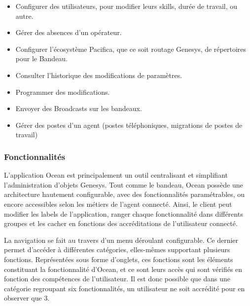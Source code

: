 \documentclass{rapport}
\begin{document}
\begin{itemize}
\item Configurer des utilisateurs, pour modifier leurs skills, durée de travail, ou autre.
\item Gérer des absences d'un opérateur.
\item Configurer l'écosystème Pacifica, que ce soit routage Genesys, de répertoires pour le Bandeau.
\item Consulter l'historique des modifications de paramètres.
\item Programmer des modifications.
\item Envoyer des Broadcasts sur les bandeaux.
\item Gérer des postes d'un agent (postes téléphoniques, migrations de postes de travail)
\end{itemize}

\subsubsection{Fonctionnalités}

L'application Ocean est principalement un outil centralisant et simplifiant l'administration d'objets Genesys. Tout comme le bandeau, Ocean possède une architecture hautement configurable, avec des fonctionnalités paramétrables, ou encore accessibles selon les métiers de l’agent connecté. Ainsi, le client peut modifier les labels de l'application, ranger chaque fonctionnalité dans différents groupes et les cacher en fonctions des accréditations de l'utilisateur connecté.


\begin{minipage}{0.55\textwidth}

La navigation se fait au travers d'un menu déroulant configurable. Ce dernier permet d'accéder à différentes catégories, elles-mêmes supportant plusieurs fonctions. Représentées sous forme d'onglets, ces fonctions sont les éléments constituant la fonctionnalité d'Ocean, et ce sont leurs accès qui sont vérifiés en fonction des compétences de l'utilisateur. Il est donc possible que dans une catégorie regroupant six fonctionnalités, un utilisateur ne soit accrédité pour en observer que 3.

\end{minipage}
\begin{minipage}{0.45\textwidth}
\end{minipage}
\vspace{5mm} %
\noindent
\\
\end{document}
